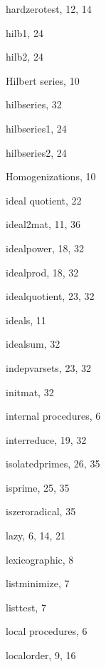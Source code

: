 \begin{theindex}
  \indexspace

  \item hardzerotest, 12, 14
  \item hilb1, 24
  \item hilb2, 24
  \item Hilbert series, 10
  \item hilbseries, 32
  \item hilbseries1, 24
  \item hilbseries2, 24
  \item Homogenizations, 10

  \indexspace

  \item ideal quotient, 22
  \item ideal2mat, 11, 36
  \item idealpower, 18, 32
  \item idealprod, 18, 32
  \item idealquotient, 23, 32
  \item ideals, 11
  \item idealsum, 32
  \item indepvarsets, 23, 32
  \item initmat, 32
  \item internal procedures, 6
  \item interreduce, 19, 32
  \item isolatedprimes, 26, 35
  \item isprime, 25, 35
  \item iszeroradical, 35

  \indexspace

  \item lazy, 6, 14, 21
  \item lexicographic, 8
  \item listminimize, 7
  \item listtest, 7
  \item local procedures, 6
  \item localorder, 9, 16

  \indexspace


\end{theindex}
